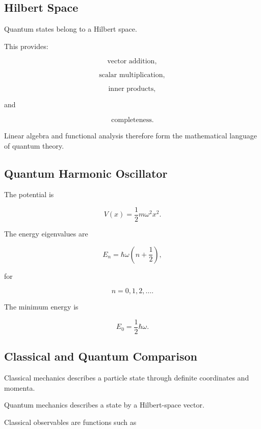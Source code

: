 \subsection{Hilbert Space}
\label{subsec:quantum-hilbert-space}

Quantum states belong to a Hilbert space.

This provides:

\[
\boxed{
\text{vector addition},
}
\]

\[
\boxed{
\text{scalar multiplication},
}
\]

\[
\boxed{
\text{inner products},
}
\]

and

\[
\boxed{
\text{completeness}.
}
\]

Linear algebra and functional analysis therefore form the mathematical
language of quantum theory.

\subsection{Quantum Harmonic Oscillator}
\label{subsec:quantum-harmonic-oscillator}

The potential is

\[
\boxed{
V(x)
=
\frac12m\omega^2x^2.
}
\]

The energy eigenvalues are

\[
\boxed{
E_n
=
\hbar\omega
\left(
n+\frac12
\right),
}
\]

for

\[
n=0,1,2,\ldots.
\]

The minimum energy is

\[
\boxed{
E_0
=
\frac12\hbar\omega.
}
\]

\subsection{Classical and Quantum Comparison}
\label{subsec:classical-quantum-comparison}

Classical mechanics describes a particle state through definite coordinates
and momenta.

Quantum mechanics describes a state by a Hilbert-space vector.

Classical observables are functions such as

